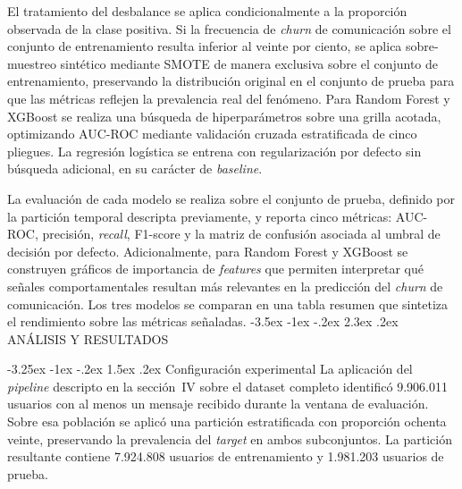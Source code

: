 \documentclass[11pt,a4paper]{article}
\makeatletter
\renewcommand\section{\@startsection{section}{1}{\z@}%
  {-3.5ex \@plus -1ex \@minus -.2ex}%
  {2.3ex \@plus.2ex}%
  {\normalfont\normalsize\centering}}
\renewcommand\subsection{\@startsection{subsection}{2}{\z@}%
  {-3.25ex \@plus -1ex \@minus -.2ex}%
  {1.5ex \@plus .2ex}%
  {\normalfont\normalsize\itshape}}
\makeatother
\begin{document}
El tratamiento del desbalance se aplica condicionalmente a la proporción observada de la clase positiva. Si la frecuencia de \textit{churn} de comunicación sobre el conjunto de entrenamiento resulta inferior al veinte por ciento, se aplica sobre-muestreo sintético mediante SMOTE \cite{chawla2002smote} de manera exclusiva sobre el conjunto de entrenamiento, preservando la distribución original en el conjunto de prueba para que las métricas reflejen la prevalencia real del fenómeno. Para Random Forest y XGBoost se realiza una búsqueda de hiperparámetros sobre una grilla acotada, optimizando AUC-ROC mediante validación cruzada estratificada de cinco pliegues. La regresión logística se entrena con regularización por defecto sin búsqueda adicional, en su carácter de \textit{baseline}.
 
La evaluación de cada modelo se realiza sobre el conjunto de prueba, definido por la partición temporal descripta previamente, y reporta cinco métricas: AUC-ROC, precisión, \textit{recall}, F1-score y la matriz de confusión asociada al umbral de decisión por defecto. Adicionalmente, para Random Forest y XGBoost se construyen gráficos de importancia de \textit{features} que permiten interpretar qué señales comportamentales resultan más relevantes en la predicción del \textit{churn} de comunicación. Los tres modelos se comparan en una tabla resumen que sintetiza el rendimiento sobre las métricas señaladas.
\section{ANÁLISIS Y RESULTADOS}

\subsection{Configuración experimental}
La aplicación del \textit{pipeline} descripto en la sección~IV sobre el dataset
completo identificó 9.906.011 usuarios con al menos un mensaje recibido
durante la ventana de evaluación. Sobre esa población se aplicó una
partición estratificada con proporción ochenta veinte, preservando la
prevalencia del \textit{target} en ambos subconjuntos. La partición
resultante contiene 7.924.808 usuarios de entrenamiento y 1.981.203
usuarios de prueba.
\end{document}
